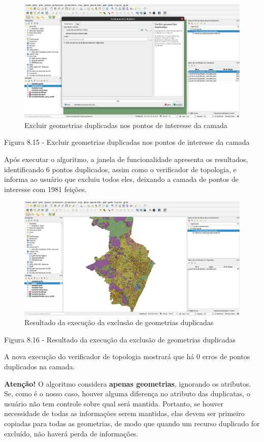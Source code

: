 \documentclass[
  portuguese,
]{krantz}
\begin{document}
\begin{figure}
\centering
\includegraphics{media/modulo8/fig815.png}
\caption{Excluir geometrias duplicadas nos pontos de interesse da camada}
\end{figure}

Figura 8.15 - Excluir geometrias duplicadas nos pontos de interesse da camada

Após executar o algoritmo, a janela de funcionalidade apresenta os resultados, identificando 6 pontos duplicados, assim como o verificador de topologia, e informa ao usuário que excluiu todos eles, deixando a camada de pontos de interesse com 1981 feições.

\begin{figure}
\centering
\includegraphics{media/modulo8/fig816.png}
\caption{Resultado da execução da exclusão de geometrias duplicadas}
\end{figure}

Figura 8.16 - Resultado da execução da exclusão de geometrias duplicadas

A nova execução do verificador de topologia mostrará que há 0 erros de pontos duplicados na camada.

\textbf{Atenção!} O algoritmo considera \textbf{apenas geometrias}, ignorando os atributos. Se, como é o nosso caso, houver alguma diferença no atributo das duplicatas, o usuário não tem controle sobre qual será mantida. Portanto, se houver necessidade de todas as informações serem mantidas, elas devem ser primeiro copiadas para todas as geometrias, de modo que quando um recurso duplicado for excluído, não haverá perda de informações.
\end{document}

